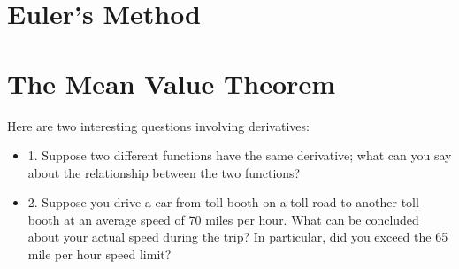 \begin{exercises}
% 
%  
%  
%  
%  
%  
%  

\end{exercises}







\section{Euler's Method}











\section{The Mean Value Theorem}

Here are two interesting questions involving derivatives:

\begin{itemize} %

\item{1.} Suppose two different functions have the same derivative;
  what can you say about the relationship between the two functions?

\item{2.} Suppose you drive a car from toll booth on a toll road to
  another toll booth at an
  average speed of 70 miles per hour. What can be concluded about your
  actual speed during the trip? In particular, did you exceed the 65
  mile per hour speed limit?

\end{itemize}

